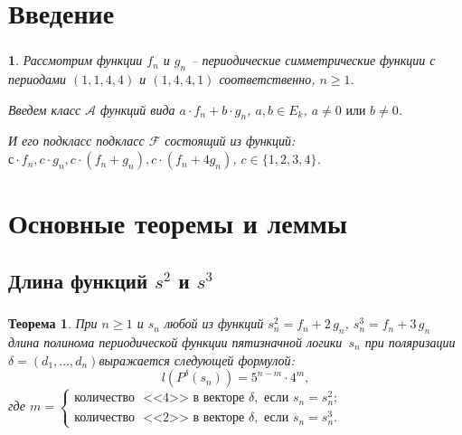 \documentclass[t]{beamer}
\newtheorem{myth}{Теорема}
\newtheorem*{mydef}{Определение}
\newtheorem*{mytext}{}
\begin{document}
\section{Введение}
\begin{frame}
\frametitle{\insertsection}
 {
\begin{mytext}
Рассмотрим функции $f_n$ и $g_n$ -- периодические симметрические функции с периодами $(1,1,4,4)$ и
$(1,4,4,1)$ соответственно, $n \geqslant 1$.

Введем класс $\mathcal{A}$ функций вида $a \cdot f_n +
 b \cdot g_n$, $a,b
\in E_k$, $a \neq 0 \text{ или }b \neq 0$.

И его подкласс подкласс $\mathcal{F}$ состоящий из
функций: $с \cdot f_n,c \cdot g_n,c\cdot(f_n+g_n),c \cdot (f_n+4g_n)$, $c \in \{1,2,3,4\}$.
\end{mytext}

}
\end{frame}

\section{Основные теоремы и леммы}
\subsection{Длина функций $s^2$ и $s^3$}
\begin{frame}
\frametitle{\insertsection}
\framesubtitle{\insertsubsection}
\begin{myth}
\label{ths}
При $n \geqslant 1$ и $s_n$ любой из функций ${s^2_n = f_n + 2\,g_n}$, ${s^3_n = f_n + 3\,g_n}$
длина полинома периодической функции пятизначной логики~$s_n$
при поляризации $\delta = (d_1,\ldots,d_n)$выражается следующей формулой:
$$ l(P^{\delta}(s_n)) = 5^{n-m} \cdot 4^m ,$$
где $m = \begin{cases}
\text{количество } \text{ <<4>> в векторе } \delta, \text{ если } s_n = s^2_n; \\
\text{количество } \text{ <<2>> в векторе } \delta, \text{ если } s_n = s^3_n.
\end{cases}$
\end{myth}
\end{frame}
\end{document}
